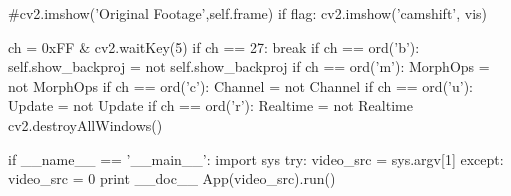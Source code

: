 \documentclass{article}
\begin{document}
\begin{python}
            #cv2.imshow('Original Footage',self.frame)
            if flag:
                cv2.imshow('camshift', vis)

            ch = 0xFF & cv2.waitKey(5)
            if ch == 27:
                break
            if ch == ord('b'):
                self.show_backproj = not self.show_backproj
            if ch == ord('m'):
                MorphOps = not MorphOps
            if ch == ord('c'):
                Channel = not Channel
            if ch == ord('u'):
                Update = not Update
            if ch == ord('r'):
                Realtime = not Realtime
        cv2.destroyAllWindows()


if __name__ == '__main__':
    import sys
    try: video_src = sys.argv[1]
    except: video_src = 0
    print __doc__
    App(video_src).run()

\end{python}
\newpage
\end{document}
